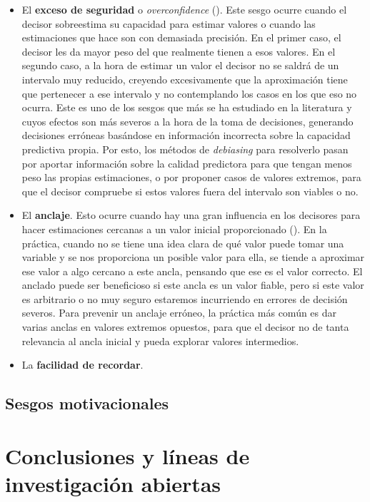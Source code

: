 \documentclass[a4paper,11pt]{article}
\begin{document}
\begin{itemize}
\item El \textbf{exceso de seguridad} o \textit{overconfidence} (\cite{moore2008}). Este sesgo ocurre cuando el decisor sobreestima su capacidad para estimar valores o cuando las estimaciones que hace son con demasiada precisión. En el primer caso, el decisor les da mayor peso del que realmente tienen a esos valores. En el segundo caso, a la hora de estimar un valor el decisor no se saldrá de un intervalo muy reducido, creyendo excesivamente que la aproximación tiene que pertenecer a ese intervalo y no contemplando los casos en los que eso no ocurra. 
Este es uno de los sesgos que más se ha estudiado en la literatura y cuyos efectos son más severos a la hora de la toma de decisiones, generando decisiones erróneas basándose en información incorrecta sobre la capacidad predictiva propia. Por esto, los métodos de \textit{debiasing} para resolverlo pasan por aportar información sobre la calidad predictora para que tengan menos peso las propias estimaciones, o por proponer casos de valores extremos, para que el decisor compruebe si estos valores fuera del intervalo son viables o no.

\item El \textbf{anclaje}. Esto ocurre cuando hay una gran influencia en los decisores para hacer estimaciones cercanas a un valor inicial proporcionado (\cite{chapman2002}). En la práctica, cuando no se tiene una idea clara de qué valor puede tomar una variable y se nos proporciona un posible valor para ella, se tiende a aproximar ese valor a algo cercano a este ancla, pensando que ese es el valor correcto. El anclado puede ser beneficioso si este ancla es un valor fiable, pero si este valor es arbitrario o no muy seguro estaremos incurriendo en errores de decisión severos. Para prevenir un anclaje erróneo, la práctica más común es dar varias anclas en valores extremos opuestos, para que el decisor no de tanta relevancia al ancla inicial y pueda explorar valores intermedios.

\item La \textbf{facilidad de recordar}. 
\end{itemize}

\subsection{Sesgos motivacionales}


\section{Conclusiones y líneas de investigación abiertas}
\end{document}

